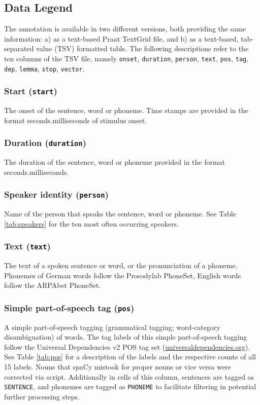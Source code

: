 \documentclass[10pt,a4paper,onecolumn]{article}
\begin{document}
\subsection*{Data Legend}
The annotation is available in two different versions, both providing the same
information: a) as a text-based Praat TextGrid file, and b) as a text-based,
tab-separated value (TSV) formatted table.
The following descriptions refer to the ten columns of the TSV file, namely
\texttt{onset}, \texttt{duration}, \texttt{person}, \texttt{text}, \texttt{pos}, \texttt{tag}, \texttt{dep}, \texttt{lemma},
\texttt{stop}, \texttt{vector}.


\subsubsection*{Start (\texttt{start})} The onset of the sentence, word or
phoneme. Time stamps are provided in the format seconds.milliseconds of stimulus
onset.


\subsubsection*{Duration (\texttt{duration})} The duration of the sentence,
word or phoneme provided in the format seconds.milliseconds.


\subsubsection*{Speaker identity (\texttt{person})} Name of the person that
speaks the sentence, word or phoneme. See Table \ref{tab:speakers} for the ten
most often occurring speakers.


\subsubsection*{Text (\texttt{text})}
The text of a spoken sentence or word, or the pronunciation of a phoneme.
Phonemes of German words follow the Prosodylab PhoneSet, English words follow
the ARPAbet PhoneSet.


\subsubsection*{Simple part-of-speech tag (\texttt{pos})} A simple
part-of-speech tagging (grammatical tagging; word-category disambiguation) of
words.
The tag labels of this simple part-of-speech tagging follow the Universal
Dependencies v2 POS tag set
(\href{https://universaldependencies.org}{universaldependencies.org}).
See Table \ref{tab:pos} for a description of the labels and the respective
counts of all 15 labels. Nouns that spaCy mistook for proper nouns or vice versa
were corrected via script.
Additionally in cells of this column, sentences are tagged as \texttt{SENTENCE},
and phonemes are tagged as \texttt{PHONEME} to facilitate filtering in potential
further processing steps.
\end{document}
